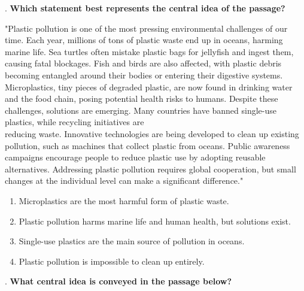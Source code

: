\documentclass[12pt]{article}
\begin{document}
\vspace{1cm}
. \textbf{Which statement best represents the central idea of the passage?}  

"Plastic pollution is one of the most pressing environmental challenges of our time. Each year, millions of tons of plastic waste end up in oceans, harming marine life. Sea turtles often mistake plastic bags for jellyfish and ingest them, causing fatal blockages. Fish and birds are also affected, with plastic debris becoming entangled around their bodies or entering their digestive systems. Microplastics, tiny pieces of degraded plastic, are now found in drinking water and the food chain, posing potential health risks to humans. Despite these challenges, solutions are emerging. Many countries have banned single-use plastics, while recycling initiatives are \\reducing waste. Innovative technologies are being developed to clean up existing pollution, such as machines that collect plastic from oceans. Public awareness \\campaigns encourage people to reduce plastic use by adopting reusable alternatives. Addressing plastic pollution requires global cooperation, but small changes at the individual level can make a significant difference."  
\begin{enumerate}[label=\Alph*.]
    \item Microplastics are the most harmful form of plastic waste.  
    \item Plastic pollution harms marine life and human health, but solutions exist.  
    \item Single-use plastics are the main source of pollution in oceans.  
    \item Plastic pollution is impossible to clean up entirely.  
\end{enumerate}

\vspace{1em}
. \textbf{What central idea is conveyed in the passage below?  }
\end{document}
